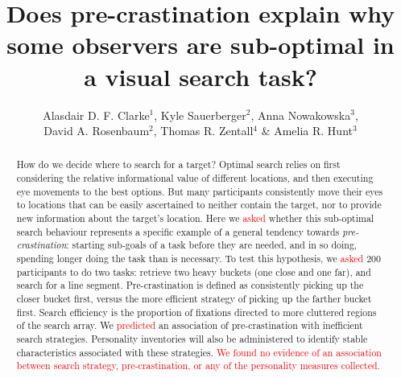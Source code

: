 \documentclass[]{rsos}
\begin{document}
\title{Does pre-crastination explain why some observers are sub-optimal in a visual search task?}

\author{Alasdair D. F. Clarke$^{1}$, Kyle Sauerberger$^{2}$, Anna Nowakowska$^{3}$,\\ David A. Rosenbaum$^{2}$, Thomas R. Zentall$^{4}$ \& Amelia R. Hunt$^{3}$}

\address{$^{1}$Dept. of Psychology, University of Essex, UK\\
$^{2}$Dept. of Psychology, University of California, USA\\
$^{3}$School of Psychology, University of Aberdeen, UK\\
$^{4}$Dept. of Psychology, University of Kentucky, USA}

\subject{Psychology}




\begin{abstract}
How do we decide where to search for a target? Optimal search relies on first considering the relative informational value of different locations, and then executing eye movements to the best options. But many participants consistently move their eyes to locations that can be easily ascertained to neither contain the target, nor to provide new information about the target's location. Here we \textcolor{red}{asked} whether this sub-optimal search behaviour represents a specific example of a general tendency towards \textit{pre-crastination}: starting sub-goals of a task before they are needed, and in so doing, spending longer doing the task than is necessary. To test this hypothesis, we \textcolor{red}{asked} 200 participants to do two tasks: retrieve two heavy buckets (one close and one far), and search for a line segment. Pre-crastination is defined as consistently picking up the closer bucket first, versus the more efficient strategy of picking up the farther bucket first. Search efficiency is the proportion of fixations directed to more cluttered regions of the search array. We \textcolor{red}{predicted} an association of pre-crastination with inefficient search strategies. Personality inventories will also be administered to identify stable characteristics associated with these strategies. \textcolor{red}{We found no evidence of an association between search strategy, pre-crastination, or any of the personality measures collected.}
\end{abstract}
\end{document}
